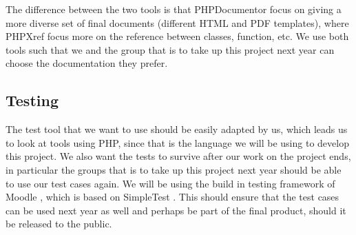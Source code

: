 The difference between the two tools is that PHPDocumentor focus on giving a more diverse set of final documents (different HTML and PDF templates), where PHPXref focus more on the reference between classes, function, etc.
We use both tools such that we and the group that is to take up this project next year can choose the documentation they prefer.


\subsection{Testing}
The test tool that we want to use should be easily adapted by us, which leads us to look at tools using PHP, since that is the language we will be using to develop this project.
We also want the tests to survive after our work on the project ends, in particular the groups that is to take up this project next year should be able to use our test cases again.
We will be using the build in testing framework of Moodle \cite{moodletest}, which is based on SimpleTest \cite{simpletest}.
This should ensure that the test cases can be used next year as well and perhaps be part of the final product, should it be released to the public.














